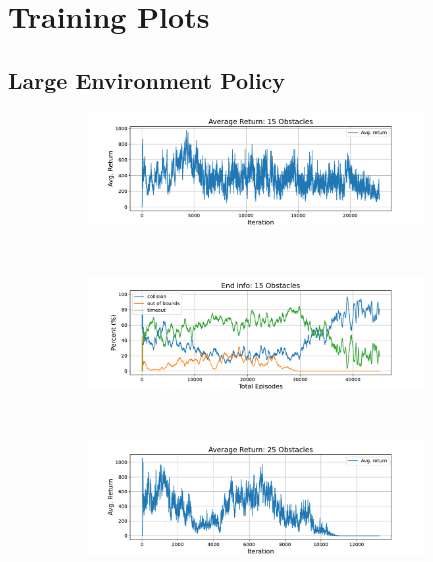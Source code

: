 \chapter{Training Plots}

\section{Large Environment Policy}
\begin{figure}[htb]
    \centering
    \begin{subfigure}[b]{\textwidth}
        \centering
        \captionsetup{justification=centering}
        \includegraphics[width=0.98\textwidth]{figures/7_/3DCarModel_BodyObs_NavSetup_15_NewObs_EnvSpace12_best3190_v1_again_reward.pdf}
        \label{fig:15_obst_nav_rew}
    \end{subfigure} \\
    \begin{subfigure}[b]{\textwidth}
        \centering
        \captionsetup{justification=centering}
        \includegraphics[width=0.98\textwidth]{figures/7_/3DCarModel_BodyObs_NavSetup_15_NewObs_EnvSpace12_best3190_v1_again_end_info.pdf}
        \label{fig:15_obst_nav_end}
    \end{subfigure} 
    \\
    \centering
    \begin{subfigure}[b]{\textwidth}
        \centering
        \captionsetup{justification=centering}
        \includegraphics[width=0.98\textwidth]{figures/7_/3DCarModel_BodyObs_NavSetup_25_NewObs_EnvSpace15_last7600_v1_again_reward.pdf}

\end{subfigure}
\end{figure}
